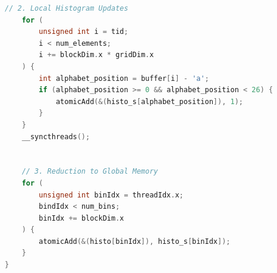 \begin{itemize}
\begin{lstlisting}[language=c++]
    // 2. Local Histogram Updates
    for (
        unsigned int i = tid;
        i < num_elements;
        i += blockDim.x * gridDim.x
    ) {
        int alphabet_position = buffer[i] - 'a';
        if (alphabet_position >= 0 && alphabet_position < 26) {
            atomicAdd(&(histo_s[alphabet_position]), 1);
        }
    }
    __syncthreads();
    
    
    // 3. Reduction to Global Memory
    for (
        unsigned int binIdx = threadIdx.x;
        bindIdx < num_bins;
        binIdx += blockDim.x
    ) {
        atomicAdd(&(histo[binIdx]), histo_s[binIdx]);
    }
}\end{lstlisting}
\end{itemize}

